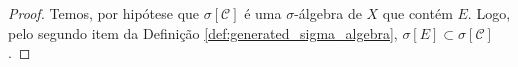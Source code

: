 \begin{proof}
    Temos, por hipótese que $\sigma [\mathcal{C}]$ é uma $\sigma$-álgebra de $X$ que contém $E$. Logo, pelo segundo item da Definição \ref{def:generated_sigma_algebra}, $\sigma [E] \subset \sigma [\mathcal{C}]$.
\end{proof}